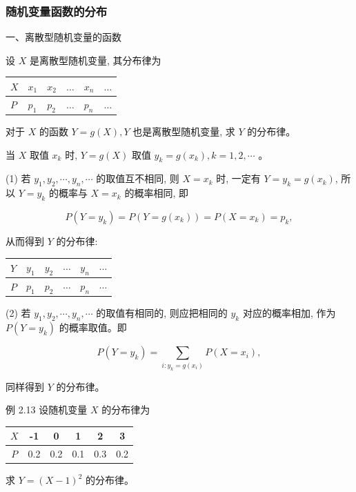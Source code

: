 \documentclass{beamer}
\begin{document}
	\begin{frame}
		\frametitle{随机变量函数的分布}
		一、离散型随机变量的函数
		
		设 $X$ 是离散型随机变量, 其分布律为
		\begin{center}
			\begin{tabular}{l|lllll}
				$X$ & $x_{1}$ & $x_{2}$ & $\ldots$ & $x_{n}$ & $\ldots$ \\
				\hline
				$P$ & $p_{1}$ & $p_{2}$ & $\ldots$ & $p_{n}$ & $\ldots$ \\
			\end{tabular}
		\end{center}
		对于 $X$ 的函数 $Y=g(X), Y$ 也是离散型随机变量, 求 $Y$ 的分布律。
		
		当 $X$ 取值 $x_{k}$ 时, $Y=g(X)$ 取值 $y_{k}=g\left(x_{k}\right), k=1,2, \cdots$ 。
		
		(1) 若 $y_{1}, y_{2}, \cdots, y_{n}, \cdots$ 的取值互不相同, 则 $X=x_{k}$ 时, 一定有 $Y=y_{k}=g\left(x_{k}\right)$, 所以 $Y=y_{k}$ 的概率与 $X=x_{k}$ 的概率相同, 即
		
		$$
		P\left(Y=y_{k}\right)=P\left(Y=g\left(x_{k}\right)\right)=P\left(X=x_{k}\right)=p_{k},
		$$
		
		从而得到 $Y$ 的分布律:
	\end{frame}
	
	\begin{frame}
		\begin{center}
			\begin{tabular}{l|lllll}
				$Y$ & $y_{1}$ & $y_{2}$ & $\cdots$ & $y_{n}$ & $\cdots$ \\
				\hline
				$P$ & $p_{1}$ & $p_{2}$ & $\cdots$ & $p_{n}$ & $\cdots$ \\
			\end{tabular}
		\end{center}
		(2) 若 $y_{1}, y_{2}, \cdots, y_{n}, \cdots$ 的取值有相同的, 则应把相同的 $y_{k}$ 对应的概率相加, 作为 $P\left(Y=y_{k}\right)$ 的概率取值。即
		
		$$
		P\left(Y=y_{k}\right)=\sum_{i: y_{k}=g\left(x_{i}\right)} P\left(X=x_{i}\right),
		$$
		
		同样得到 $Y$ 的分布律。
	\end{frame}

	\begin{frame}
			例 2.13 设随机变量 $X$ 的分布律为
		\begin{center}
			\begin{tabular}{c|ccccc}
				$X$ & -1 & 0 & 1 & 2 & 3 \\
				\hline
				$P$ & 0.2 & 0.2 & 0.1 & 0.3 & 0.2 \\
			\end{tabular}
		\end{center}
		求 $Y=(X-1)^{2}$ 的分布律。
	\end{frame}
	
\end{document}
